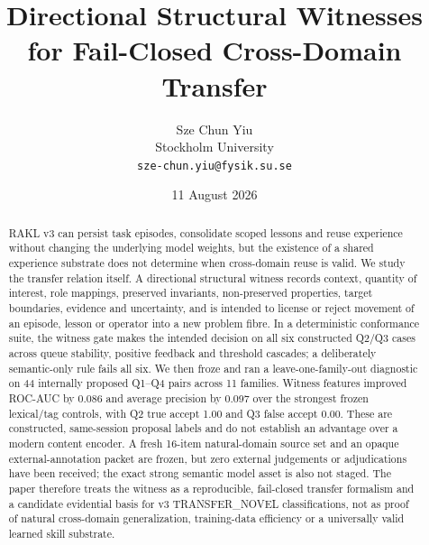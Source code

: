 \documentclass[11pt]{article}
\title{Directional Structural Witnesses for Fail-Closed Cross-Domain Transfer}
\author{Sze Chun Yiu\\Stockholm University\\\texttt{sze-chun.yiu@fysik.su.se}}
\date{11 August 2026}
\begin{document}
\maketitle
\begin{abstract}
RAKL v3 can persist task episodes, consolidate scoped lessons and reuse experience without changing the underlying model weights, but the existence of a shared experience substrate does not determine when cross-domain reuse is valid. We study the transfer relation itself. A directional structural witness records context, quantity of interest, role mappings, preserved invariants, non-preserved properties, target boundaries, evidence and uncertainty, and is intended to license or reject movement of an episode, lesson or operator into a new problem fibre. In a deterministic conformance suite, the witness gate makes the intended decision on all six constructed Q2/Q3 cases across queue stability, positive feedback and threshold cascades; a deliberately semantic-only rule fails all six. We then froze and ran a leave-one-family-out diagnostic on 44 internally proposed Q1--Q4 pairs across 11 families. Witness features improved ROC-AUC by 0.086 and average precision by 0.097 over the strongest frozen lexical/tag controls, with Q2 true accept 1.00 and Q3 false accept 0.00. These are constructed, same-session proposal labels and do not establish an advantage over a modern content encoder. A fresh 16-item natural-domain source set and an opaque external-annotation packet are frozen, but zero external judgements or adjudications have been received; the exact strong semantic model asset is also not staged. The paper therefore treats the witness as a reproducible, fail-closed transfer formalism and a candidate evidential basis for v3 TRANSFER_NOVEL classifications, not as proof of natural cross-domain generalization, training-data efficiency or a universally valid learned skill substrate.
\end{abstract}









\end{document}
